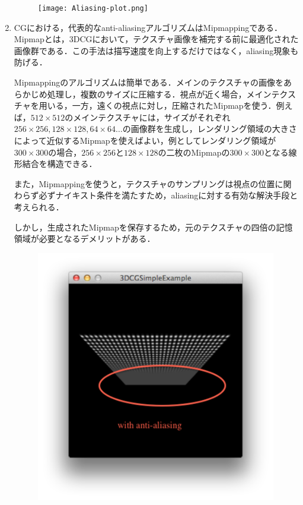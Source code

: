 \documentclass[a4paper,11pt]{jsarticle}
\numberwithin{theorem}{section}  %
\numberwithin{equation}{section} %
\begin{document}
\begin{enumerate}
\begin{figure}[H]
\texttt{[image: Aliasing-plot.png]}
\end{figure}

\item

CGにおける，代表的なanti-aliasingアルゴリズムはMipmappingである．Mipmapとは，3DCGにおいて，テクスチャ画像を補完する前に最適化された画像群である．この手法は描写速度を向上するだけではなく，aliasing現象も防げる．

Mipmappingのアルゴリズムは簡単である．メインのテクスチャの画像をあらかじめ処理し，複数のサイズに圧縮する．視点が近く場合，メインテクスチャを用いる，一方，遠くの視点に対し，圧縮されたMipmapを使う．例えば，$512\times512$のメインテクスチャには，サイズがそれぞれ$256\times256,128\times128,64\times64\dots$の画像群を生成し，レンダリング領域の大きさによって近似するMipmapを使えばよい，例としてレンダリング領域が$300\times300$の場合，$256\times256$と$128\times 128$の二枚のMipmapの$300\times300$となる線形結合を構造できる．

また，Mipmappingを使うと，テクスチャのサンプリングは視点の位置に関わらず必ずナイキスト条件を満たすため，aliasingに対する有効な解決手段と考えられる．

しかし，生成されたMipmapを保存するため，元のテクスチャの四倍の記憶領域が必要となるデメリットがある．
\begin{figure}[H]
\includegraphics[bb=0 0 444 451,width=10.5cm]{with_mipmapping.pdf}
\end{figure}


\end{enumerate}
\end{document}
